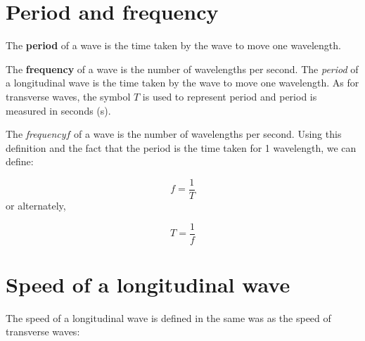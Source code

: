             \section{Period and frequency}
            \nopagebreak
            \par
{} {The \textbf{period} of a wave is the time taken by the wave to move one wavelength.} 
\par
  {The \textbf{frequency} of a wave is the number of wavelengths per second.} 
        \label{m38782*id292523}The \textsl{period} of a longitudinal wave is the time taken by the wave to move one wavelength. As for transverse waves, the symbol $T$ is used to represent period and period is measured in seconds (s).\par 
        \label{m38782*id292542}The \textsl{frequency}$f$ of a wave is the number of wavelengths per second. Using this definition and the fact that the period is the time taken for 1 wavelength, we can define:\par 
        \label{m38782*id291687}\nopagebreak\noindent{}
          
    \begin{equation*}
    f=\frac{1}{T}
      \end{equation*}
        \label{m38782*id291706}or alternately,\par 
        \label{m38782*id292764}\nopagebreak\noindent{}
    \begin{equation*}
    T=\frac{1}{f}
      \end{equation*}
      \label{m38782*uid11}
            \section{Speed of a longitudinal wave}
            \nopagebreak
            \label{m38782*id292794}The speed of a longitudinal wave is defined in the same was as the speed of transverse waves:\par 
%           

